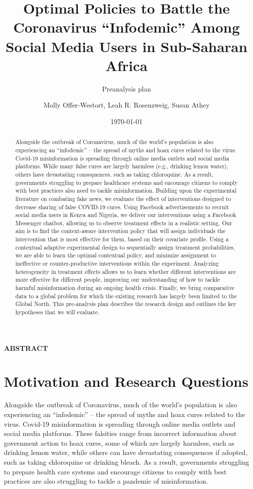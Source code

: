 \documentclass[letterpaper, 12pt, parskip=full,DIV=12]{scrartcl}
\title{Optimal Policies to Battle the Coronavirus ``Infodemic'' Among Social Media Users in Sub-Saharan Africa}
\subtitle{Preanalysis plan}
\author{Molly Offer-Westort, Leah R. Rosenzweig, Susan Athey}
\date{\today}
\begin{document}
%
\normalsize%
\maketitle%
\tableofcontents%
\clearpage%


\centerline{\textbf{ABSTRACT}}
\begin{abstract}
Alongside the outbreak of Coronavirus, much of the world’s population is also experiencing an “infodemic” -- the spread of myths and hoax cures related to the virus. Covid-19 misinformation is spreading through online media outlets and social media platforms. While many false cures are largely harmless (e.g., drinking lemon water), others have devastating consequences, such as taking chloroquine. As a result, governments struggling to prepare healthcare systems and encourage citizens to comply with best practices also need to tackle misinformation. Building upon the experimental literature on combating fake news, we evaluate the effect of interventions designed to decrease sharing of false COVID-19 cures. Using Facebook advertisements to recruit social media users in Kenya and Nigeria, we deliver our interventions using a Facebook Messenger chatbot, allowing us to observe treatment effects in a realistic setting. Our aim is to find the context-aware intervention policy that will assign individuals the intervention that is most effective for them, based on their covariate profile. Using a contextual adaptive experimental design to sequentially assign treatment probabilities, we are able to learn the optimal contextual policy, and minimize assignment to ineffective or counter-productive interventions within the experiment. Analyzing heterogeneity in treatment effects allows us to learn whether different interventions are more effective for different people, improving our understanding of how to tackle harmful misinformation during an ongoing health crisis. Finally, we bring comparative data to a global problem for which the existing research has largely been limited to the Global North. This pre-analysis plan describes the research design and outlines the key hypotheses that we will evaluate.
\end{abstract}





\section{Motivation and Research Questions}

Alongside the outbreak of Coronavirus, much of the world's population is also experiencing an ``infodemic'' -- the spread of myths and hoax cures related to the virus. Covid-19 misinformation is spreading through online media outlets and social media platforms. These falsities range from incorrect information about government action to hoax cures, some of which are largely harmless, such as drinking lemon water, while others can have devastating consequences if adopted, such as taking chloroquine or drinking bleach. As a result, governments struggling to prepare health care systems and encourage citizens to comply with best practices are also struggling to tackle a pandemic of misinformation.
\end{document}
